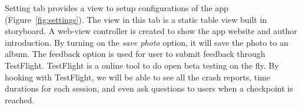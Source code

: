 Setting tab provides a view to setup configurations of the app (Figure~\ref{fig:settings}). The view in this tab is a static table view built in storyboard. A web-view controller is created to show the app website and author introduction. By turning on the \emph{save photo} option, it will save the photo to an album. The feedback option is used for user to submit feedback through TestFlight. TestFlight is a online tool to do open beta testing on the fly. By hooking with TestFlight, we will be able to see all the crash reports, time durations for each session, and even ask questions to users when a checkpoint is reached.\\


\begin{figure}
	\centering
	 \hfill

\end{figure}
